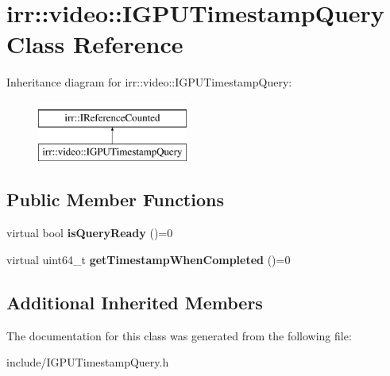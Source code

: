 \hypertarget{classirr_1_1video_1_1IGPUTimestampQuery}{}\section{irr\+:\+:video\+:\+:I\+G\+P\+U\+Timestamp\+Query Class Reference}
\label{classirr_1_1video_1_1IGPUTimestampQuery}
Inheritance diagram for irr\+:\+:video\+:\+:I\+G\+P\+U\+Timestamp\+Query\+:\begin{figure}[H]
\begin{center}
\leavevmode
\includegraphics[height=2.000000cm]{classirr_1_1video_1_1IGPUTimestampQuery}
\end{center}
\end{figure}
\subsection*{Public Member Functions}
\begin{DoxyCompactItemize}
\item 
virtual bool {\bfseries is\+Query\+Ready} ()=0\hypertarget{classirr_1_1video_1_1IGPUTimestampQuery_a4259a73853a5892a6c7757b7aaa188be}{}\label{classirr_1_1video_1_1IGPUTimestampQuery_a4259a73853a5892a6c7757b7aaa188be}

\item 
virtual uint64\+\_\+t {\bfseries get\+Timestamp\+When\+Completed} ()=0\hypertarget{classirr_1_1video_1_1IGPUTimestampQuery_a1de290890c933d2a6a1a7c979e777dcf}{}\label{classirr_1_1video_1_1IGPUTimestampQuery_a1de290890c933d2a6a1a7c979e777dcf}

\end{DoxyCompactItemize}
\subsection*{Additional Inherited Members}


The documentation for this class was generated from the following file\+:\begin{DoxyCompactItemize}
\item 
include/I\+G\+P\+U\+Timestamp\+Query.\+h\end{DoxyCompactItemize}
